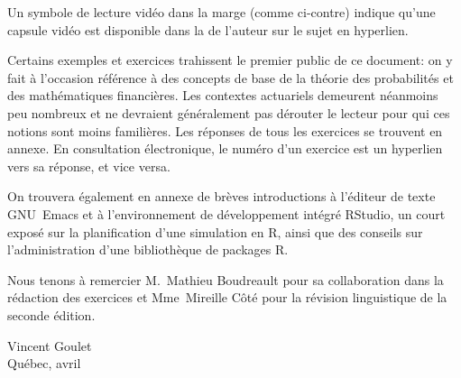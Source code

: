 Un symbole de lecture vidéo dans la marge (comme ci-contre) indique
qu'une capsule vidéo est disponible dans la %
de l'auteur sur le sujet en hyperlien.

Certains exemples et exercices trahissent le premier public de ce
document: on y fait à l'occasion référence à des concepts de base de
la théorie des probabilités et des mathématiques financières. Les
contextes actuariels demeurent néanmoins peu nombreux et ne devraient
généralement pas dérouter le lecteur pour qui ces notions sont moins
familières. Les réponses de tous les exercices se trouvent en annexe.
En consultation électronique, le numéro d'un exercice est un hyperlien
vers sa réponse, et vice versa.

On trouvera également en annexe de brèves introductions à l'éditeur de
texte GNU~Emacs et à l'environnement de développement intégré RStudio,
un court exposé sur la planification d'une simulation en R, ainsi que
des conseils sur l'administration d'une bibliothèque de packages R.

Nous tenons à remercier M.~Mathieu Boudreault pour sa collaboration
dans la rédaction des exercices et Mme~Mireille Côté pour la révision
linguistique de la seconde édition.

\begin{flushright}
  Vincent Goulet \\
  Québec, avril \year
\end{flushright}


